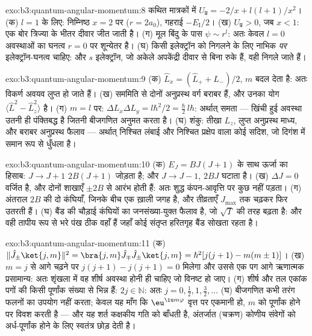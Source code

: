 \begin{solution}{exo:b3:quantum-angular-momentum:8}
कथित मात्रकों में $U_{\text{प्र}} = -2/x + l(l+1)/x^2$। (क)
$l = 1$ के लिए: निम्निष्ठ $x = 2$ पर ($r = 2a_0$), गहराई $-E_{\text{I}}/2$।
(ख) $U_{\text{प्र}} > 0$, जब $x < 1$: एक बोर त्रिज्या के भीतर
दीवार जीत जाती है। (ग) मूल बिंदु के पास $\psi \sim r^l$: अतः केवल
$l = 0$ अवस्थाओं का घनत्व $r = 0$ पर शून्येतर है। (घ) किसी इलेक्ट्रॉन
को निगलने के लिए नाभिक \emph{पर} इलेक्ट्रॉन-घनत्व चाहिए: और $s$
इलेक्ट्रॉन, जो अकेले अपकेंद्री दीवार से बिना रुके हैं, वही निगले जाते हैं।
\end{solution}

\begin{solution}{exo:b3:quantum-angular-momentum:9}
(क) $\hat L_x = (\hat L_+ + \hat L_-)/2$, $m$ बदल देता है: अतः विकर्ण
अवयव लुप्त हो जाते हैं। (ख) सममिति से दोनों अनुप्रस्थ वर्ग बराबर हैं,
और उनका योग $\langle\hat L^2 - \hat L_z^2\rangle$ है। (ग)
$m = l$ पर: $\Delta L_x\Delta L_y = l\hbar^2/2 = \tfrac\hbar2
\,l\hbar$: अर्थात् समता --- खिंची हुई अवस्था उतनी ही पंक्तिबद्ध है
जितनी बीजगणित अनुमत करता है। (घ) शंकु: तीखा $L_z$, लुप्त अनुप्रस्थ
माध्य, और बराबर अनुप्रस्थ फैलाव --- अर्थात् निश्चित लंबाई और निश्चित
प्रक्षेप वाला कोई सदिश, जो दिगंश में समान रूप से धुँधला है।
\end{solution}

\begin{solution}{exo:b3:quantum-angular-momentum:10}
(क) $E_J = BJ(J+1)$ के साथ ऊर्जा का हिसाब: $J \to J + 1$
$2B(J+1)$ जोड़ता है; और $J \to J - 1$, $2BJ$ घटाता है। (ख) $\Delta J = 0$
वर्जित है, और दोनों शाखाएँ $\pm 2B$ से आरंभ होती हैं: अतः शुद्ध
कंपन-आवृत्ति पर कुछ नहीं पड़ता। (ग) अंतराल $2B$ की दो कंघियाँ, जिनके
बीच एक ख़ाली जगह है, और तीव्रताएँ $J_{\max}$ तक चढ़कर फिर उतरती हैं। (घ)
बैंड की चौड़ाई कंघियों का जनसंख्या-युक्त फैलाव है, जो
$\sqrt{T}$ की तरह बढ़ता है: और वही तापीय रूप से भरे पंख ठीक वहाँ हैं
जहाँ कोई संतृप्त हरितगृह बैंड सोखता रहता है।
\end{solution}

\begin{solution}{exo:b3:quantum-angular-momentum:11}
(क) $\|\hat J_\pm\ket{j,m}\|^2 = \bra{j,m}\hat J_\mp\hat J_\pm
\ket{j,m} = \hbar^2[j(j+1) - m(m\pm1)]$। (ख) $m = j$ से आगे चढ़ने पर
$j(j+1) - j(j+1) = 0$ मिलेगा और उससे एक पग आगे ऋणात्मक प्रसामान्य:
अतः शृंखला में वह शीर्ष अवस्था होनी ही चाहिए जो विनष्ट हो जाए। (ग)
शीर्ष और तल एकांक पगों की किसी पूर्णांक संख्या से भिन्न हैं: $2j \in
\mathbb N$: अतः $j = 0, \tfrac12, 1, \tfrac32, \dots$ (घ) बीजगणित
कभी तरंग फलनों का उपयोग नहीं करता; केवल यह माँग कि
$\eu^{\iu m\varphi}$ वृत्त पर एकमानी हो, $m$ को पूर्णांक होने पर
विवश करती है --- और यह शर्त कक्षकीय गति को बाँधती है, अंतर्जात
(चक्रण) कोणीय संवेगों को अर्ध-पूर्णांक होने के लिए स्वतंत्र छोड़ देती है।
\end{solution}

